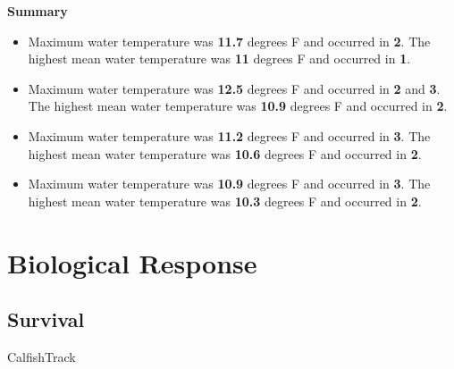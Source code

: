 \documentclass[
]{book}
\providecommand{\tightlist}{%
  \setlength{\itemsep}{0pt}\setlength{\parskip}{0pt}}
\theoremstyle{definition}
\theoremstyle{definition}
\theoremstyle{definition}
\theoremstyle{definition}
\theoremstyle{remark}
\begin{document}
\textbf{Summary}

\begin{itemize}
\tightlist
\item
  Maximum water temperature was \textbf{11.7} degrees F and occurred in \textbf{2}. The highest mean water temperature was \textbf{11} degrees F and occurred in \textbf{1}.
\item
  Maximum water temperature was \textbf{12.5} degrees F and occurred in \textbf{2} and \textbf{3}. The highest mean water temperature was \textbf{10.9} degrees F and occurred in \textbf{2}.
\item
  Maximum water temperature was \textbf{11.2} degrees F and occurred in \textbf{3}. The highest mean water temperature was \textbf{10.6} degrees F and occurred in \textbf{2}.
\item
  Maximum water temperature was \textbf{10.9} degrees F and occurred in \textbf{3}. The highest mean water temperature was \textbf{10.3} degrees F and occurred in \textbf{2}.
\end{itemize}

\hypertarget{biological-response-4}{%
\section{Biological Response}\label{biological-response-4}}

\hypertarget{survival}{%
\subsection{Survival}\label{survival}}

CalfishTrack
\end{document}
